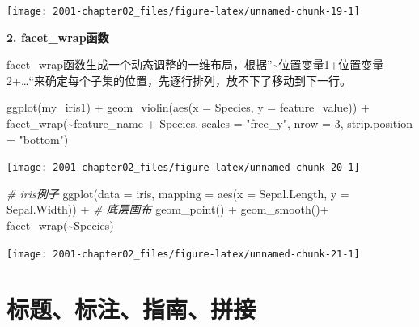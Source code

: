 \documentclass[
]{book}
\newenvironment{Shaded}{\begin{snugshade}}{\end{snugshade}}
\newcommand{\AttributeTok}[1]{\textcolor[rgb]{0.77,0.63,0.00}{#1}}
\newcommand{\CommentTok}[1]{\textcolor[rgb]{0.56,0.35,0.01}{\textit{#1}}}
\newcommand{\DecValTok}[1]{\textcolor[rgb]{0.00,0.00,0.81}{#1}}
\newcommand{\FunctionTok}[1]{\textcolor[rgb]{0.00,0.00,0.00}{#1}}
\newcommand{\NormalTok}[1]{#1}
\newcommand{\SpecialCharTok}[1]{\textcolor[rgb]{0.00,0.00,0.00}{#1}}
\newcommand{\StringTok}[1]{\textcolor[rgb]{0.31,0.60,0.02}{#1}}
\begin{document}
\begin{center}\texttt{[image: 2001-chapter02\_files/figure-latex/unnamed-chunk-19-1]} \end{center}

\textbf{2. facet\_wrap函数}

facet\_wrap函数生成一个动态调整的一维布局，根据''\textasciitilde 位置变量1+位置变量2+\ldots``来确定每个子集的位置，先逐行排列，放不下了移动到下一行。

\begin{Shaded}
\begin{Highlighting}[]
\FunctionTok{ggplot}\NormalTok{(my\_iris1) }\SpecialCharTok{+} \FunctionTok{geom\_violin}\NormalTok{(}\FunctionTok{aes}\NormalTok{(}\AttributeTok{x =}\NormalTok{ Species, }\AttributeTok{y =}\NormalTok{ feature\_value)) }\SpecialCharTok{+} \FunctionTok{facet\_wrap}\NormalTok{(}\SpecialCharTok{\textasciitilde{}}\NormalTok{feature\_name }\SpecialCharTok{+} 
\NormalTok{    Species, }\AttributeTok{scales =} \StringTok{"free\_y"}\NormalTok{, }\AttributeTok{nrow =} \DecValTok{3}\NormalTok{, }\AttributeTok{strip.position =} \StringTok{"bottom"}\NormalTok{)}
\end{Highlighting}
\end{Shaded}

\begin{center}\texttt{[image: 2001-chapter02\_files/figure-latex/unnamed-chunk-20-1]} \end{center}

\begin{Shaded}
\begin{Highlighting}[]
\CommentTok{\# iris例子}
\FunctionTok{ggplot}\NormalTok{(}\AttributeTok{data =}\NormalTok{ iris, }\AttributeTok{mapping =} \FunctionTok{aes}\NormalTok{(}\AttributeTok{x =}\NormalTok{ Sepal.Length, }\AttributeTok{y =}\NormalTok{ Sepal.Width)) }\SpecialCharTok{+}  \CommentTok{\# 底层画布}
  \FunctionTok{geom\_point}\NormalTok{() }\SpecialCharTok{+}
  \FunctionTok{geom\_smooth}\NormalTok{()}\SpecialCharTok{+}
  \FunctionTok{facet\_wrap}\NormalTok{(}\SpecialCharTok{\textasciitilde{}}\NormalTok{Species)}
\end{Highlighting}
\end{Shaded}

\begin{center}\texttt{[image: 2001-chapter02\_files/figure-latex/unnamed-chunk-21-1]} \end{center}

\hypertarget{ux6807ux9898ux6807ux6ce8ux6307ux5357ux62fcux63a5}{%
\section{标题、标注、指南、拼接}\label{ux6807ux9898ux6807ux6ce8ux6307ux5357ux62fcux63a5}}
\end{document}
